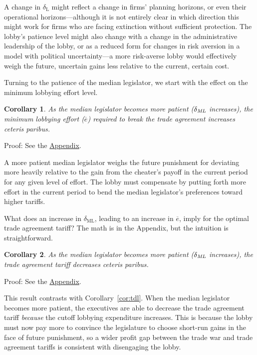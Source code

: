 \documentclass[authoryear, review]{elsarticle}
\newtheorem{corollary}{Corollary}
\newcommand{\ov}{\overline}
\newcommand{\de}{\delta}
\begin{document}
A change in $\de_\text{L}$ might reflect a change in firms' planning horizons, or even their operational horizons---although it is not entirely clear in which direction this might work for firms who are facing extinction without sufficient protection. The lobby's patience level might also change with a change in the administrative leadership of the lobby, or as a reduced form for changes in risk aversion in a model with political uncertainty---a more risk-averse lobby would effectively weigh the future, uncertain gains less relative to the current, certain cost.

Turning to the patience of the median legislator, we start with the effect on the minimum lobbying effort level.

\begin{corollary}
  As the median legislator becomes more patient ($\de_\emph{ML}$ increases), the minimum lobbying effort ($\ov{e}$) required to break the trade agreement increases \emph{ceteris paribus}.
  \label{cor:edm}
\end{corollary}

Proof: See the \hyperlink{Cor_edm}{Appendix}.

\noindent A more patient median legislator weighs the future punishment for deviating more heavily relative to the gain from the cheater's payoff in the current period for any given level of effort. The lobby must compensate by putting forth more effort in the current period to bend the median legislator's preferences toward higher tariffs.

What does an increase in $\de_\text{ML}$, leading to an increase in $\ov{e}$, imply for the optimal trade agreement tariff? The math is in the Appendix, but the intuition is straightforward.

\begin{corollary}
  As the median legislator becomes more patient ($\de_\emph{ML}$ increases), the trade agreement tariff decreases \emph{ceteris paribus}.
  \label{cor:tdm}
\end{corollary}

Proof: See the \hyperlink{Cor_tdm}{Appendix}.

\noindent This result contrasts with Corollary~\ref{cor:tdl}. When the median legislator becomes more patient, the executives are able to decrease the trade agreement tariff \textit{because} the cutoff lobbying expenditure increases. This is because the lobby must now pay more to convince the legislature to choose short-run gains in the face of future punishment, so a wider profit gap between the trade war and trade agreement tariffs is consistent with disengaging the lobby.
\end{document}
